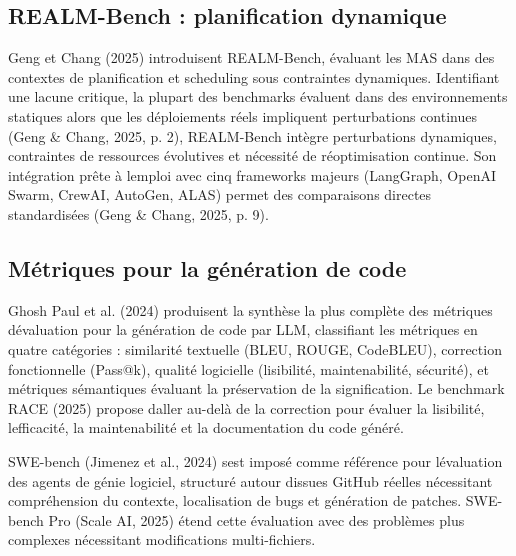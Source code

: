 \documentclass[12pt,a4paper]{article}
\begin{document}
\subsection{REALM-Bench : planification
dynamique}\label{realm-bench--planification-dynamique}

Geng et Chang (2025) introduisent REALM-Bench, évaluant les MAS dans des
contextes de planification et scheduling sous contraintes dynamiques.
Identifiant une lacune critique, la plupart des benchmarks évaluent
dans des environnements statiques alors que les déploiements réels
impliquent perturbations continues (Geng \& Chang, 2025, p. 2),
REALM-Bench intègre perturbations dynamiques, contraintes de ressources
évolutives et nécessité de réoptimisation continue. Son intégration
prête à l\textquotesingle emploi avec cinq frameworks majeurs
(LangGraph, OpenAI Swarm, CrewAI, AutoGen, ALAS) permet des comparaisons
directes standardisées (Geng \& Chang, 2025, p. 9).

\subsection{Métriques pour la génération de
code}\label{muxe9triques-pour-la-guxe9nuxe9ration-de-code}

Ghosh Paul et al. (2024) produisent la synthèse la plus complète des
métriques d\textquotesingle évaluation pour la génération de code par
LLM, classifiant les métriques en quatre catégories : similarité
textuelle (BLEU, ROUGE, CodeBLEU), correction fonctionnelle (Pass@k),
qualité logicielle (lisibilité, maintenabilité, sécurité), et métriques
sémantiques évaluant la préservation de la signification. Le benchmark
RACE (2025) propose d\textquotesingle aller au-delà de la correction
pour évaluer la lisibilité, l\textquotesingle efficacité, la
maintenabilité et la documentation du code généré.

SWE-bench (Jimenez et al., 2024) s\textquotesingle est imposé comme
référence pour l\textquotesingle évaluation des agents de génie
logiciel, structuré autour d\textquotesingle issues GitHub réelles
nécessitant compréhension du contexte, localisation de bugs et
génération de patches. SWE-bench Pro (Scale AI, 2025) étend cette
évaluation avec des problèmes plus complexes nécessitant modifications
multi-fichiers.
\end{document}
